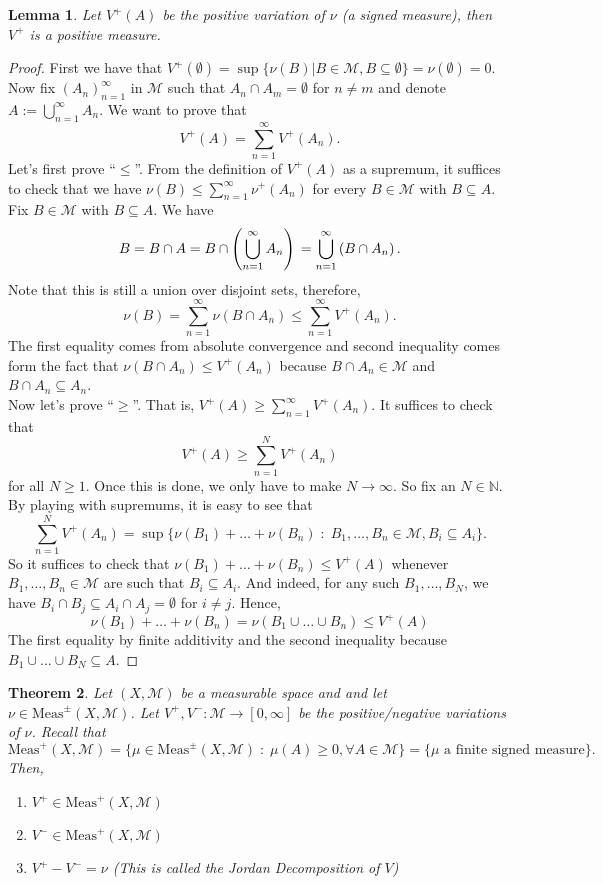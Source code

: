 \documentclass[letterpaper, 12pt]{article}
\newcommand{\st}{\; : \; }
\newcommand{\cM}{\mathcal{M}}
\newcommand{\bN}{\mathbb{N}}
\newcommand{\Meas}{\mathrm{Meas}}
\providecommand{\mbrac}[1] {\left( #1 \right)}
\theoremstyle{stdthm}
\newtheorem{thm}{Theorem}[section]
\newtheorem{lem}[thm]{Lemma}
\theoremstyle{stddef}
\theoremstyle{stdnonum}
\theoremstyle{stdqands}
\theoremstyle{stdbold}
\begin{document}
\begin{lem}
Let $V^+(A)$ be the positive variation of $\nu$ (a signed measure), then $V^+$ is a positive measure. 
\end{lem}

\begin{proof}
First we have that $V^+(\emptyset) = \sup \{ \nu(B) | B \in \cM, B \subseteq \emptyset\} = \nu(\emptyset) = 0$. Now fix $(A_n)_{n=1}^\infty$ in $\cM$ such that $A_n \cap A_m = \emptyset$ for $n \neq m$ and denote $A:= \bigcup_{n=1}^\infty A_n$. We want to prove that 
\[ V^+(A) = \sum_{n=1}^\infty V^+(A_n).\]
Let's first prove ``$\leq$''. From the definition of $V^+(A)$ as a supremum, it suffices to check that we have $\nu(B) \leq \sum_{n=1}^\infty \nu^+(A_n)$ for every $B \in \cM$ with $B \subseteq A$. Fix $B \in \cM$ with $B \subseteq A$. We have 
\[
B = B \cap A = B \cap \mbrac{\bigcup_{n=1}^\infty A_n }\\
= \bigcup_{n=1}^\infty \mbrac{B \cap A_n}.
\]
Note that this is still a union over disjoint sets, therefore, 
\[
\nu(B) = \sum_{n=1}^\infty \nu(B \cap A_n) \leq \sum_{n=1}^\infty V^+(A_n).
\]
The first equality comes from absolute convergence and second inequality comes form the fact that $\nu(B \cap A_n) \leq V^+(A_n)$ because $B \cap A_n \in \cM$ and $B \cap A_n \subseteq A_n$.\\
Now let's prove ``$\geq$''. That is, $V^+(A) \geq \sum_{n=1}^\infty V^+(A_n)$. It suffices to check that 
\[
V^+(A) \geq \sum_{n=1}^N V^+(A_n)
\]
for all $N \geq 1$.
Once this is done, we only have to make $N \rightarrow \infty$. So fix an $N \in \bN$. By playing with supremums, it is easy to see that 
\[
\sum_{n=1}^N V^+(A_n) = \sup \{ \nu(B_1) + \dots + \nu(B_n)\st B_1,\dots, B_n \in \cM, B_i \subseteq A_i\}.
\]
So it suffices to check that $\nu(B_1) + \dots + \nu(B_n) \leq V^+(A)$ whenever $B_1, \dots, B_n \in \cM$ are such that $B_i \subseteq A_i$.  And indeed, for any such $B_1, \dots, B_N$, we have $B_i \cap B_j \subseteq A_i \cap A_j = \emptyset$ for $i \neq j$. Hence, 
\[ \nu(B_1) + \dots + \nu(B_n) = \nu(B_1 \cup \dots \cup B_n) \leq V^+(A)\]
The first equality by finite additivity and the second inequality because $B_1 \cup \dots \cup B_N \subseteq A$. 
\end{proof}

\begin{thm} %
Let $(X,\cM)$ be a measurable space and and let $\nu \in \Meas^\pm(X,\cM)$. Let $V^+,V^-: \cM \rightarrow [0,\infty]$ be the positive/negative variations of $\nu$. Recall that 
\[\Meas^+ (X, \cM) = \{\mu \in \Meas^\pm(X,\cM)\st \mu(A) \geq 0, \forall A \in \cM\} = \{ \mu \mbox{ a finite signed measure} \}. \] Then, 
\begin{enumerate}
\item $V^+ \in \Meas^+(X,\cM)$
\item $V^- \in \Meas^+(X,\cM)$
\item $V^+ - V^- = \nu$ (This is called the Jordan Decomposition of $V$)
\end{enumerate}
\end{thm}
\end{document}

